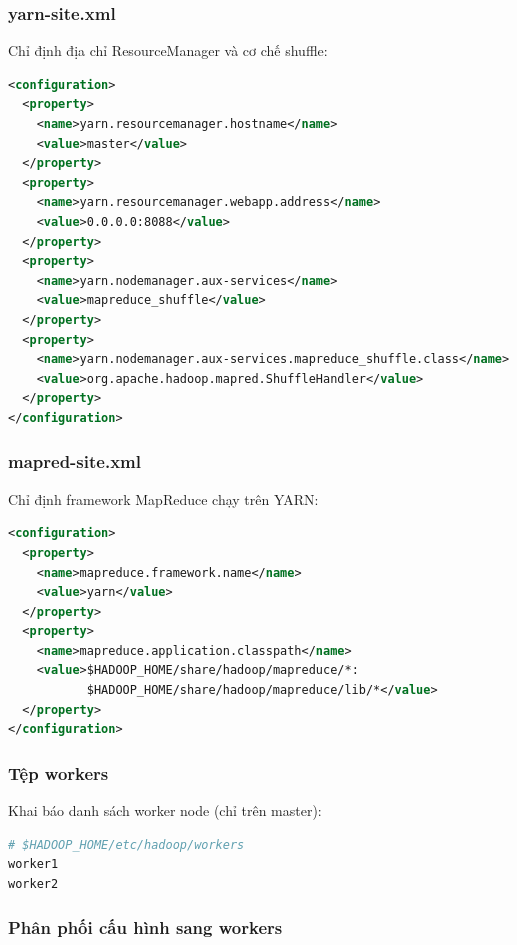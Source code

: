 \subsubsection{yarn-site.xml}

Chỉ định địa chỉ ResourceManager và cơ chế shuffle:

\begin{lstlisting}[language=xml, numbers=none]
<configuration>
  <property>
    <name>yarn.resourcemanager.hostname</name>
    <value>master</value>
  </property>
  <property>
    <name>yarn.resourcemanager.webapp.address</name>
    <value>0.0.0.0:8088</value>
  </property>
  <property>
    <name>yarn.nodemanager.aux-services</name>
    <value>mapreduce_shuffle</value>
  </property>
  <property>
    <name>yarn.nodemanager.aux-services.mapreduce_shuffle.class</name>
    <value>org.apache.hadoop.mapred.ShuffleHandler</value>
  </property>
</configuration>
\end{lstlisting}

\subsubsection{mapred-site.xml}

Chỉ định framework MapReduce chạy trên YARN:

\begin{lstlisting}[language=xml, numbers=none]
<configuration>
  <property>
    <name>mapreduce.framework.name</name>
    <value>yarn</value>
  </property>
  <property>
    <name>mapreduce.application.classpath</name>
    <value>$HADOOP_HOME/share/hadoop/mapreduce/*:
           $HADOOP_HOME/share/hadoop/mapreduce/lib/*</value>
  </property>
</configuration>
\end{lstlisting}

\subsubsection{Tệp workers}

Khai báo danh sách worker node (chỉ trên master):

\begin{lstlisting}[language=bash, numbers=none]
# $HADOOP_HOME/etc/hadoop/workers
worker1
worker2
\end{lstlisting}

\subsubsection{Phân phối cấu hình sang workers}

